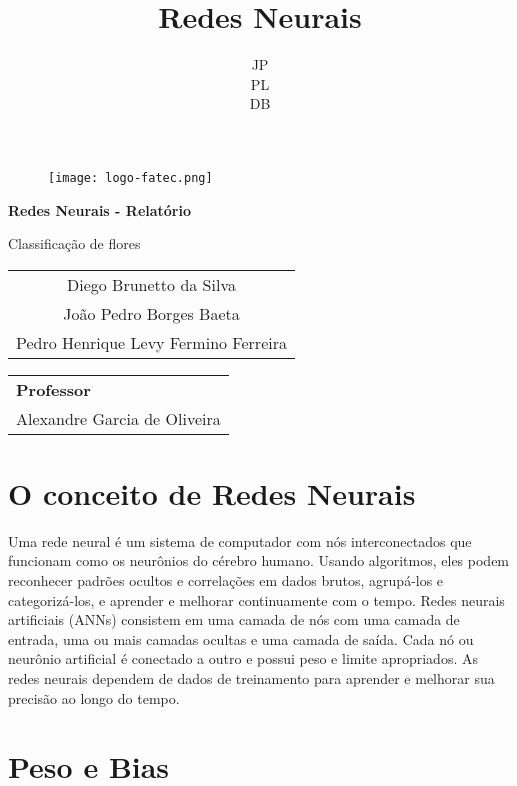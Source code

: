 \documentclass[12pt]{article}
\title{\fontsize{24}{28}\selectfont Redes Neurais}
\author{\fontsize{14}{16}\selectfont JP \\ PL \\ DB}
\date{}
\begin{document}
\begin{figure}[t]
  \centering
  \texttt{[image: logo-fatec.png]}
\end{figure}
\begin{titlepage}
    \centering
    \vspace*{4cm}
    {\LARGE\bfseries \fontsize{24}{28}\selectfont Redes Neurais - Relatório\par}
    \vspace{0.25cm}
    {\Large \fontsize{18}{22}\selectfont Classificação de flores\par}
    \vfill 
    \centering
    \begin{tabular}{c}
        \fontsize{14}{16}\selectfont Diego Brunetto da Silva \\
        \fontsize{14}{16}\selectfont João Pedro Borges Baeta \\
        \fontsize{14}{16}\selectfont Pedro Henrique Levy Fermino Ferreira
    \end{tabular}
    \vspace*{\fill}
    
    \centering
    \begin{tabular}{l}
        \textbf{Professor} \\
        Alexandre Garcia de Oliveira
    \end{tabular}
\end{titlepage}

\tableofcontents
\newpage

\section{O conceito de Redes Neurais}

Uma rede neural é um sistema de computador com nós interconectados que funcionam como os neurônios do cérebro humano. Usando algoritmos, eles podem reconhecer padrões ocultos e correlações em dados brutos, agrupá-los e categorizá-los, e aprender e melhorar continuamente com o tempo. Redes neurais artificiais (ANNs) consistem em uma camada de nós com uma camada de entrada, uma ou mais camadas ocultas e uma camada de saída. Cada nó ou neurônio artificial é conectado a outro e possui peso e limite apropriados. As redes neurais dependem de dados de treinamento para aprender e melhorar sua precisão ao longo do tempo.

\section {Peso e Bias}
\end{document}
